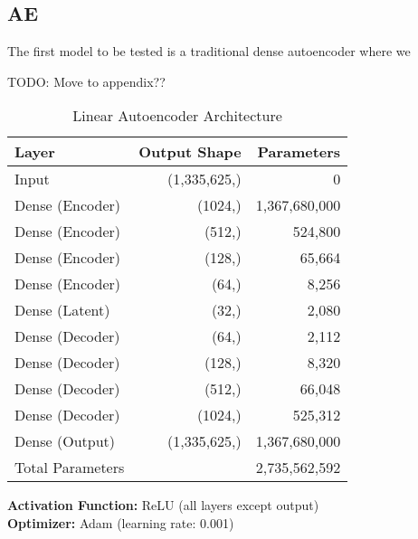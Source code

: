 \subsection{AE}
\label{resdis:tiny-ae}

The first model to be tested is a traditional dense autoencoder  where we

TODO: Move to appendix??
\begin{table}[hpbt]
    \centering
    \caption{Linear Autoencoder Architecture}
    \begin{tabular}{lrr}
        \toprule
        Layer & Output Shape & Parameters \\
        \midrule
        Input & (1,335,625,) & 0 \\
        Dense (Encoder) & (1024,) & 1,367,680,000 \\
        Dense (Encoder) & (512,) & 524,800 \\
        Dense (Encoder) & (128,) & 65,664 \\
        Dense (Encoder) & (64,) & 8,256 \\
        Dense (Latent) & (32,) & 2,080 \\
        Dense (Decoder) & (64,) & 2,112 \\
        Dense (Decoder) & (128,) & 8,320 \\
        Dense (Decoder) & (512,) & 66,048 \\
        Dense (Decoder) & (1024,) & 525,312 \\
        Dense (Output) & (1,335,625,) & 1,367,680,000 \\
        \midrule
        Total Parameters & & 2,735,562,592 \\
        \bottomrule
    \end{tabular}
    \label{tab:linear_autoencoder}
\end{table}

\textbf{Activation Function:} ReLU (all layers except output)\\
\textbf{Optimizer:} Adam (learning rate: 0.001)